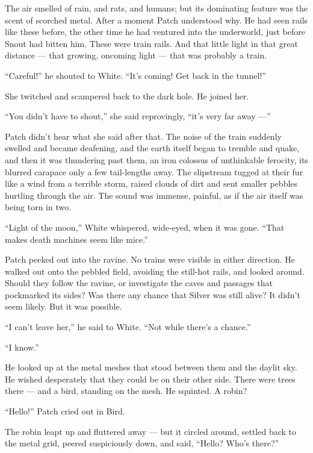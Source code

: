 \documentclass[ebook,oneside,openany,17pt]{memoir}
\newenvironment{tolerant}[1]{%
  \par\tolerance=#1\relax
}{%
  \par
}
\begin{document}
The air smelled of rain, and rats, and humans; but its dominating
feature was the scent of scorched metal. After a moment Patch
understood why. He had seen rails like these before, the other time he
had ventured into the underworld, just before Snout had bitten
him. These were train rails. And that little light in that great
distance — that growing, oncoming light — that was probably a train.

“Careful!” he shouted to White. “It’s coming! Get back in the tunnel!”

She twitched and scampered back to the dark hole. He joined her.

“You didn’t have to shout,” she said reprovingly, “it’s very far away
—”

\begin{tolerant}{1000}
Patch didn’t hear what she said after that. The noise of the train
suddenly swelled and became deafening, and the earth itself began to
tremble and quake, and then it was thundering past them, an iron
colossus of unthinkable ferocity, its blurred carapace only a few
tail-lengths away. The slipstream tugged at their fur like a wind from
a terrible storm, raised clouds of dirt and sent smaller pebbles
hurt\-ling through the air. The sound was immense, pain\-ful, as if the
air itself was being torn in two.
\end{tolerant}

“Light of the moon,” White whispered, wide-eyed, when it was
gone. “That makes death machines seem like mice.”

Patch peeked out into the ravine. No trains were visible in either
direction. He walked out onto the pebbled field, avoiding the
still-hot rails, and looked around. Should they follow the ravine, or
investigate the caves and passages that pockmarked its sides? Was
there any chance that Silver was still alive? It didn’t seem
likely. But it was possible.

“I can’t leave her,” he said to White. “Not while there’s a chance.”

“I know.”

He looked up at the metal meshes that stood between them and the
daylit sky. He wished desperately that they could be on their other
side. There were trees there — and a bird, standing on the mesh. He
squinted. A robin?

“Hello!” Patch cried out in Bird.

The robin leapt up and fluttered away — but it circled around, settled
back to the metal grid, peered suspiciously down, and said, “Hello?
Who’s there?”
\end{document}
